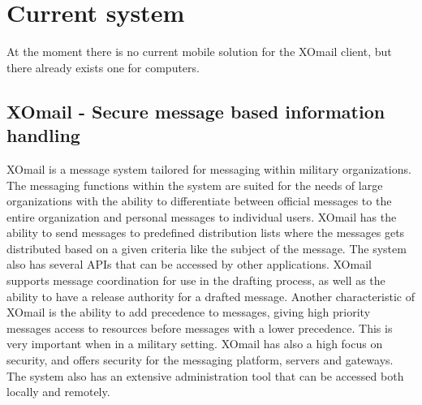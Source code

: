 \section{Current system}

At the moment there is no current mobile solution for the XOmail client, but there already exists one for computers.

\subsection{XOmail - Secure message based information handling}

XOmail is a message system tailored for messaging within military organizations. The messaging functions within the system are suited for the needs of large organizations with the ability to differentiate between official messages to the entire organization and personal messages to individual users.
\newline
\newline
XOmail has the ability to send messages to predefined distribution lists where the messages gets distributed based on a given criteria like the subject of the message. The system also has several APIs that can be accessed by other applications. XOmail supports message coordination for use in the drafting process, as well as the ability to have a release authority for a drafted message.
\newline
\newline 
Another characteristic of XOmail is the ability to add precedence to messages, giving high priority messages access to resources before messages with a lower precedence. This is very important when in a military setting.
\newline
\newline
XOmail has also a high focus on security, and offers security for the messaging platform, servers and gateways.
\newline
\newline
The system also has an extensive administration tool that can be accessed both locally and remotely.
